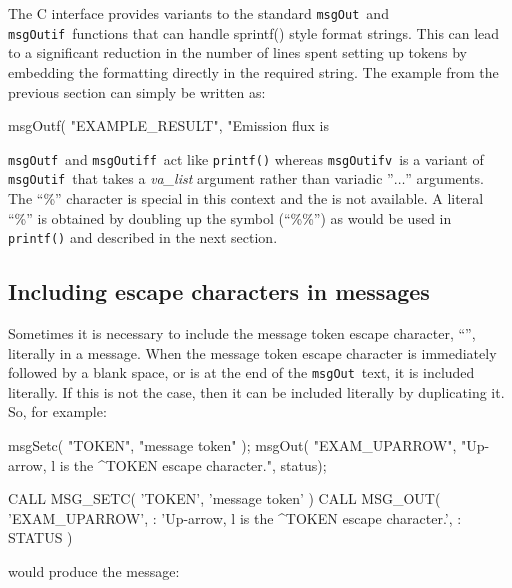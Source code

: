 \documentclass[twoside,11pt]{starlink}
\providecommand{\func}[1]{\texttt{#1}}
\providecommand{\farg}[1]{\textit{#1}}
\providecommand{\msgout}{\func{msgOut}}
\providecommand{\msgoutf}{\func{msgOutf}}
\providecommand{\msgoutif}{\func{msgOutif}}
\providecommand{\msgoutiff}{\func{msgOutiff}}
\providecommand{\msgoutifv}{\func{msgOutifv}}
\begin{document}
The C interface provides variants to the standard \msgout\ and
\msgoutif\ functions that can handle sprintf() style format
strings. This can lead to a significant reduction in the number of
lines spent setting up tokens by embedding the formatting directly
in the required string. The example from the previous section can
simply be written as:

\begin{small}
\begin{terminalv}
msgOutf( "EXAMPLE_RESULT",
       "Emission flux is %
\end{terminalv}
\end{small}

\msgoutf\ and \msgoutiff\ act like \func{printf()} whereas \msgoutifv\
is a variant of \msgoutif\ that takes a \farg{va\_list} argument rather
than variadic ''$\ldots$'' arguments. The ``\%'' character is special
in this context and the 
 is not available. A literal ``\%''
is obtained by doubling up the symbol (``\%\%'') as would be used in
\func{printf()} and described in the next section.

\subsection{Including escape characters in messages}
Sometimes it is necessary to include the message token escape character,
``\wedge'', literally in a message.
When the message token escape character is immediately followed by a blank
space, or is at the end of the \msgout\ text, it is included literally.
If this is not the case, then it can be included literally by duplicating it.
So, for example:

\begin {small}
\begin{terminalv}
      msgSetc( "TOKEN", "message token" );
      msgOut( "EXAM_UPARROW",
              "Up-arrow, ^^, is the ^TOKEN escape character.", status);

      CALL MSG_SETC( 'TOKEN', 'message token' )
      CALL MSG_OUT( 'EXAM_UPARROW',
     :             'Up-arrow, ^^, is the ^TOKEN escape character.',
     :             STATUS )
\end{terminalv}
\end {small}

would produce the message:
\end{document}
